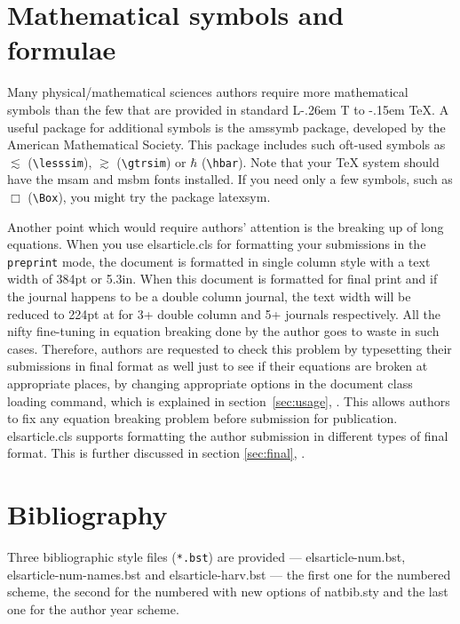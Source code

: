 \documentclass[a4paper,12pt]{article}
\makeatletter
\def\file#1{\textsf{#1}\xspace}
\DeclareRobustCommand{\LaTeX}{L\kern-.26em%
        {\sbox\z@ T%
         \vbox to\ht\z@{\hbox{\check@mathfonts
           \fontsize\sf@size\z@
           \math@fontsfalse\selectfont
          A\,}%
         \vss}%
        }%
     \kern-.15em%
    \TeX}
\makeatother
\begin{document}
\section[Mathematical ...]{Mathematical symbols and formulae}

Many physical/mathematical sciences authors require more
mathematical symbols than the few that are provided in standard
\LaTeX. A useful package for additional symbols is the
\file{amssymb} package, developed by the American Mathematical
Society. This package includes such oft-used symbols as
$\lesssim$ (\verb+\lesssim+), $\gtrsim$ (\verb+\gtrsim+)  or 
$\hbar$ (\verb+\hbar+). Note that your \TeX{}
system should have the \file{msam} and \file{msbm} fonts installed. If
you need only a few symbols, such as $\Box$ (\verb+\Box+), you might try the
package \file{latexsym}.

Another point which would require authors' attention is the
breaking up of long equations.  When you use
\file{elsarticle.cls} for formatting your submissions in the 
\verb+preprint+ mode, the document is formatted in single column
style with a text width of 384pt or 5.3in.  When this document is
formatted for final print and if the journal happens to be a double column
journal, the text width will be reduced to 224pt at for 3+
double column and 5+ journals respectively. All the nifty 
fine-tuning in equation breaking done by the author goes to waste in
such cases.  Therefore, authors are requested to check this
problem by typesetting their submissions in final format as well
just to see if their equations are broken at appropriate places,
by changing appropriate options in the document class loading
command, which is explained in section~\ref{sec:usage},
. This allows authors to fix any equation breaking
problem before submission for publication.
\file{elsarticle.cls} supports formatting the author submission
in different types of final format.  This is further discussed in
section \ref{sec:final}, .

\section{Bibliography}

Three bibliographic style files (\verb+*.bst+) are provided ---
\file{elsarticle-num.bst}, \file{elsarticle-num-names.bst} and
\file{elsarticle-harv.bst} --- the first one for the numbered scheme, the
second for the numbered with new options of \file{natbib.sty} and the
last one for the author year scheme.
\end{document}
